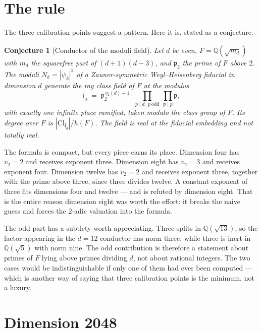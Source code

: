 \documentclass[12pt,a4paper]{article}
\newtheorem{conjecture}[theorem]{Conjecture}
\newcommand{\Fd}{F}
\newcommand{\md}{m_d}
\newcommand{\pt}{\mathfrak{p}_2}
\newcommand{\Cl}{\mathrm{Cl}}
\begin{document}
\section{The rule}
\label{sec:rule}

The three calibration points suggest a pattern. Here it is, stated as a conjecture.

\begin{conjecture}[Conductor of the moduli field]
\label{conj:rule}
Let $d$ be even, $\Fd = \mathbb{Q}(\sqrt{\md})$ with $\md$ the squarefree part of $(d+1)(d-3)$, and $\pt$ the prime of $\Fd$ above $2$. The moduli $N_k = |\psi_k|^2$ of a Zauner-symmetric Weyl--Heisenberg fiducial in dimension $d$ generate the ray class field of $\Fd$ at the modulus
\[
\mathfrak{f}_d \;=\; \pt^{\,v_2(d)+1}\cdot \prod_{p\mid d,\ p\ \mathrm{odd}}\
\prod_{\mathfrak{p}\mid p}\mathfrak{p},
\]
with exactly one infinite place ramified, taken modulo the class group of $\Fd$. Its degree over $\Fd$ is $|\Cl_{\mathfrak{f}_d}|/h(\Fd)$. The field is real at the fiducial embedding and not totally real.
\end{conjecture}

The formula is compact, but every piece earns its place. Dimension four has $v_2 = 2$ and receives exponent three. Dimension eight has $v_2 = 3$ and receives exponent four. Dimension twelve has $v_2 = 2$ and receives exponent three, together with the prime above three, since three divides twelve. A constant exponent of three fits dimensions four and twelve — and is refuted by dimension eight. That is the entire reason dimension eight was worth the effort: it breaks the naive guess and forces the $2$-adic valuation into the formula.

The odd part has a subtlety worth appreciating. Three splits in $\mathbb{Q}(\sqrt{13})$, so the factor appearing in the $d=12$ conductor has norm three, while three is inert in $\mathbb{Q}(\sqrt5)$ with norm nine. The odd contribution is therefore a statement about primes of $\Fd$ lying above primes dividing $d$, not about rational integers. The two cases would be indistinguishable if only one of them had ever been computed — which is another way of saying that three calibration points is the minimum, not a luxury.

\section{Dimension 2048}
\label{sec:d2048}
\end{document}
